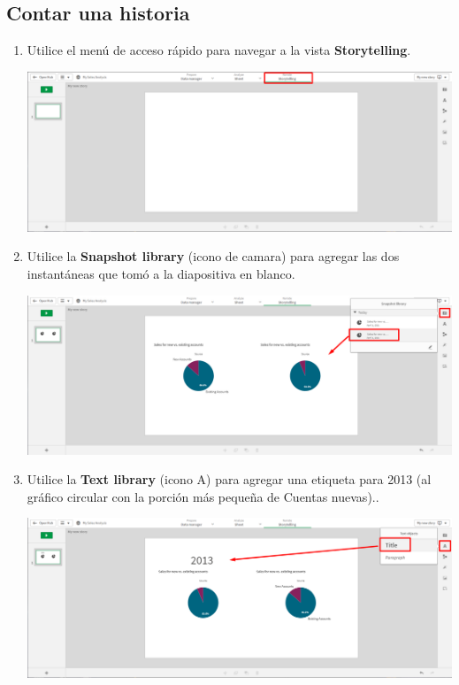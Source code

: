 \documentclass[12pt,letterpaper]{article}
\newcommand\tab[1][1cm]{\hspace*{#1}}
\begin{document}
    \subsection{Contar una historia}
    \begin{enumerate}[\tab 1.]
        \item Utilice el menú de acceso rápido para navegar a la vista \textbf{Storytelling}.
        \begin{center}
            \includegraphics[width=13cm]{./img/img43.png}
        \end{center}
        \item Utilice la \textbf{Snapshot library} (icono de camara) para agregar las dos instantáneas que tomó a la diapositiva en blanco.
        \begin{center}
            \includegraphics[width=13cm]{./img/img44.png}
        \end{center}
        \item Utilice la \textbf{Text library} (icono A) para agregar una etiqueta para 2013 (al gráfico circular con la porción más pequeña de Cuentas nuevas)..
        \begin{center}
            \includegraphics[width=13cm]{./img/img45.png}

\end{center}
\end{enumerate}
\end{document}
